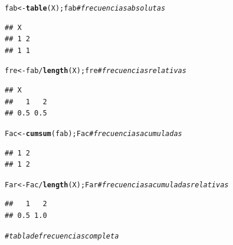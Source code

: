 \documentclass[12pt,letterpaper]{article}\usepackage[]{graphicx}\usepackage[]{color}
\makeatletter
\newcommand{\hlcom}[1]{\textcolor[rgb]{0.678,0.584,0.686}{\textit{#1}}}%
\newcommand{\hlopt}[1]{\textcolor[rgb]{0,0,0}{#1}}%
\newcommand{\hlstd}[1]{\textcolor[rgb]{0.345,0.345,0.345}{#1}}%
\newcommand{\hlkwb}[1]{\textcolor[rgb]{0.69,0.353,0.396}{#1}}%
\newcommand{\hlkwd}[1]{\textcolor[rgb]{0.737,0.353,0.396}{\textbf{#1}}}%
\newenvironment{kframe}{%
 \def\at@end@of@kframe{}%
 \ifinner\ifhmode%
  \def\at@end@of@kframe{\end{minipage}}%
  \begin{minipage}{\columnwidth}%
 \fi\fi%
 \def\FrameCommand##1{\hskip\@totalleftmargin \hskip-\fboxsep
 \colorbox{shadecolor}{##1}\hskip-\fboxsep
     \hskip-\linewidth \hskip-\@totalleftmargin \hskip\columnwidth}%
 \MakeFramed {\advance\hsize-\width
   \@totalleftmargin\z@ \linewidth\hsize
   \@setminipage}}%
 {\par\unskip\endMakeFramed%
 \at@end@of@kframe}
\newenvironment{knitrout}{}{} %
\makeatother
\begin{document}
\begin{enumerate}
\begin{knitrout}
\begin{kframe}
\begin{alltt}
\hlstd{fab} \hlkwb{<-} \hlkwd{table}\hlstd{(X); fab} \hlcom{# frecuencias absolutas }
\end{alltt}
\begin{verbatim}
## X
## 1 2 
## 1 1
\end{verbatim}
\begin{alltt}
\hlstd{fre} \hlkwb{<-} \hlstd{fab}\hlopt{/}\hlkwd{length}\hlstd{(X); fre} \hlcom{# frecuencias relativas }
\end{alltt}
\begin{verbatim}
## X
##   1   2 
## 0.5 0.5
\end{verbatim}
\begin{alltt}
\hlstd{Fac} \hlkwb{<-} \hlkwd{cumsum}\hlstd{(fab); Fac} \hlcom{# frecuencias acumuladas }
\end{alltt}
\begin{verbatim}
## 1 2 
## 1 2
\end{verbatim}
\begin{alltt}
\hlstd{Far} \hlkwb{<-} \hlstd{Fac}\hlopt{/}\hlkwd{length}\hlstd{(X); Far} \hlcom{# frecuencias acumuladas relativas }
\end{alltt}
\begin{verbatim}
##   1   2 
## 0.5 1.0
\end{verbatim}
\end{kframe}
\end{knitrout}
\begin{knitrout}
\color{fgcolor}\begin{kframe}
\begin{alltt}
\hlcom{# tabla de frecuencias completa}


\end{alltt}
\end{kframe}
\end{knitrout}
\end{enumerate}
\end{document}
